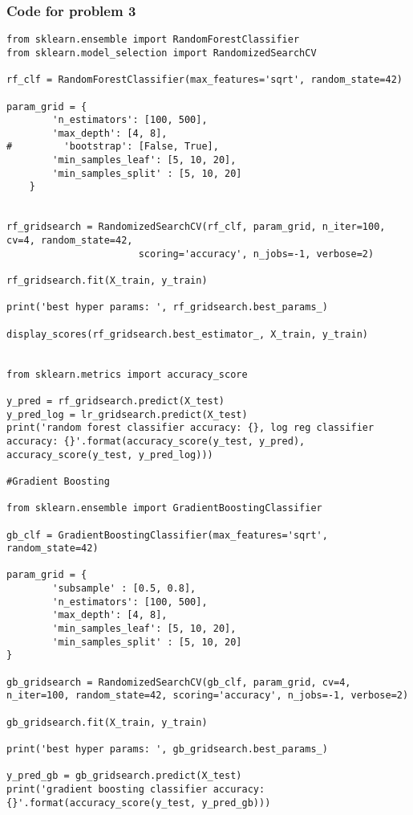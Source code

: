 \documentclass[12pt]{article}%
\begin{document}
\subsubsection*{Code for problem 3}
\begin{lstlisting}
from sklearn.ensemble import RandomForestClassifier
from sklearn.model_selection import RandomizedSearchCV

rf_clf = RandomForestClassifier(max_features='sqrt', random_state=42)

param_grid = {
        'n_estimators': [100, 500],
        'max_depth': [4, 8],
#         'bootstrap': [False, True],
        'min_samples_leaf': [5, 10, 20],
        'min_samples_split' : [5, 10, 20] 
    }


rf_gridsearch = RandomizedSearchCV(rf_clf, param_grid, n_iter=100, cv=4, random_state=42,
                       scoring='accuracy', n_jobs=-1, verbose=2)

rf_gridsearch.fit(X_train, y_train)

print('best hyper params: ', rf_gridsearch.best_params_)

display_scores(rf_gridsearch.best_estimator_, X_train, y_train)


from sklearn.metrics import accuracy_score

y_pred = rf_gridsearch.predict(X_test)
y_pred_log = lr_gridsearch.predict(X_test)
print('random forest classifier accuracy: {}, log reg classifier accuracy: {}'.format(accuracy_score(y_test, y_pred), accuracy_score(y_test, y_pred_log)))

#Gradient Boosting

from sklearn.ensemble import GradientBoostingClassifier

gb_clf = GradientBoostingClassifier(max_features='sqrt', random_state=42)

param_grid = {
        'subsample' : [0.5, 0.8],
        'n_estimators': [100, 500],
        'max_depth': [4, 8],
        'min_samples_leaf': [5, 10, 20],
        'min_samples_split' : [5, 10, 20]
}

gb_gridsearch = RandomizedSearchCV(gb_clf, param_grid, cv=4, n_iter=100, random_state=42, scoring='accuracy', n_jobs=-1, verbose=2)

gb_gridsearch.fit(X_train, y_train)

print('best hyper params: ', gb_gridsearch.best_params_)

y_pred_gb = gb_gridsearch.predict(X_test)
print('gradient boosting classifier accuracy: {}'.format(accuracy_score(y_test, y_pred_gb)))
\end{lstlisting}
\end{document}
